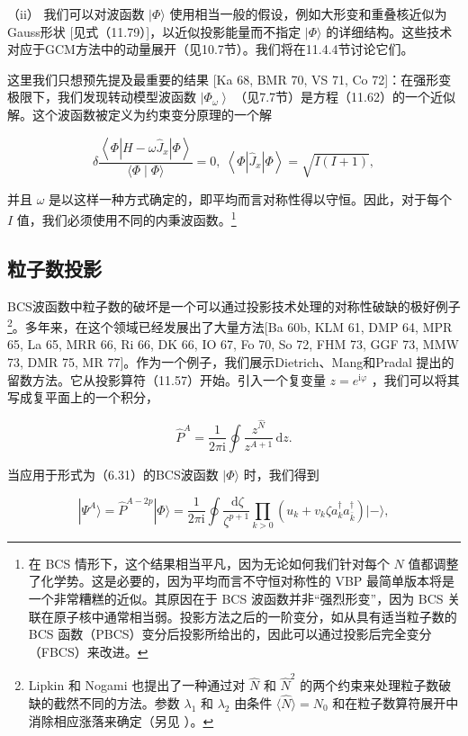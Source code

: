 （ii） 我们可以对波函数 $|\Phi\rangle$ 使用相当一般的假设，例如大形变和重叠核近似为Gauss形状 {[}见式（11.79）{]}，以近似投影能量而不指定
$|\Phi\rangle$ 的详细结构。这些技术对应于GCM方法中的动量展开（见10.7节）。我们将在11.4.4节讨论它们。

这里我们只想预先提及最重要的结果 {[}Ka 68, BMR 70, VS 71, Co 72{]}：在强形变极限下，我们发现转动模型波函数
$\left|{\Phi}_{\omega}\right\rangle $ （见7.7节）是方程（11.62）的一个近似解。这个波函数被定义为约束变分原理的一个解

\[
\delta\frac{\left\langle \Phi\left|H-\omega{\widehat{J}}_{x}\right|\Phi\right\rangle }{\langle\Phi\mid\Phi\rangle}=0,\;\left\langle {\Phi\left|{\widehat{J}}_{x}\right|\Phi}\right\rangle =\sqrt{I\left({I+1}\right)},\tag{11.64}
\]

并且 $\omega$ 是以这样一种方式确定的，即平均而言对称性得以守恒。因此，对于每个 $I$ 值，我们必须使用不同的内秉波函数。\footnote{在 BCS 情形下，这个结果相当平凡，因为无论如何我们针对每个 $N$ 值都调整了化学势。这是必要的，因为平均而言不守恒对称性的
VBP 最简单版本将是一个非常糟糕的近似。其原因在于 BCS 波函数并非“强烈形变”，因为 BCS 关联在原子核中通常相当弱。投影方法之后的一阶变分，如从具有适当粒子数的
BCS 函数（PBCS）变分后投影所给出的，因此可以通过投影后完全变分（FBCS）来改进。}

\subsection{粒子数投影}

BCS波函数中粒子数的破坏是一个可以通过投影技术处理的对称性破缺的极好例子\footnote{Lipkin 和 Nogami \cite{Li60b,No64b,NZ64,SR78} 也提出了一种通过对 $\hat{N}$
和 $\hat{N}^{2}$ 的两个约束来处理粒子数破缺的截然不同的方法。参数 $\lambda_{1}$ 和 $\lambda_{2}$
由条件 $\langle\hat{N}\rangle=N_{0}$ 和在粒子数算符展开中消除相应涨落来确定（另见 \cite{Pr65,Sa67}）。}。多年来，在这个领域已经发展出了大量方法{[}Ba 60b, KLM 61, DMP 64, MPR 65, La 65, MRR
66, Ri 66, DK 66, IO 67, Fo 70, So 72, FHM 73, GGF 73, MMW 73, DMR
75, MR 77{]}。作为一个例子，我们展示Dietrich、Mang和Pradal \cite{DMP64}提出的留数方法。它从投影算符（11.57）开始。引入一个复变量
$z={e}^{\mathrm{i}\varphi}$ ，我们可以将其写成复平面上的一个积分，

\[
{\widehat{P}}^{A}=\frac{1}{2\pi\mathrm{i}}\oint\frac{{z}^{\widehat{N}}}{{z}^{A+1}}{\,\mathrm{d}z}.\tag{11.65}
\]

当应用于形式为（6.31）的BCS波函数 $|\Phi\rangle$ 时，我们得到

\[
|\Psi^{A}\rangle={\widehat{P}}^{A-2p}|\Phi\rangle=\frac{1}{2\pi\mathrm{i}}\oint\frac{\,\mathrm{d}\zeta}{\zeta^{p+1}}\mathop{\prod}\limits_{k>0}\left(u_{k}+v_{k}\zeta a^{\dagger}_{k}a^{\dagger}_{\bar{k}}\right)|-\rangle,\tag{11.66}
\]

